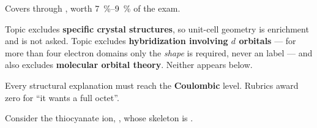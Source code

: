 \documentclass{apchem-exam}
\begin{document}
\apctitleblock

\begin{apcnote}
Covers  through , worth
\SI{7}{\percent}--\SI{9}{\percent} of the exam.

Topic  excludes \textbf{specific crystal structures}, so
unit-cell geometry is enrichment and is not asked. Topic 
excludes \textbf{hybridization involving $d$ orbitals} --- for more than
four electron domains only the \emph{shape} is required, never an
 label --- and also excludes \textbf{molecular orbital theory}.
Neither appears below.

Every structural explanation must reach the \textbf{Coulombic} level.
Rubrics award zero for ``it wants a full octet''.
\end{apcnote}



Consider the thiocyanate ion, , whose skeleton is
.
\end{document}
